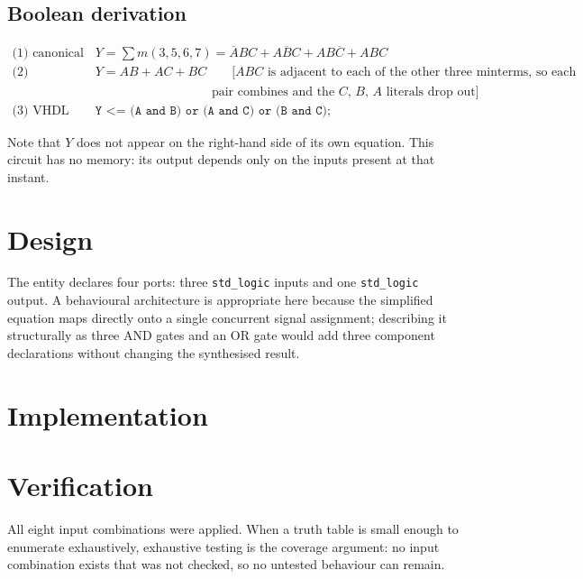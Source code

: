 \subsection*{Boolean derivation}

\begin{align*}
\text{(1) canonical} \quad & Y = \textstyle\sum m(3,5,6,7)
   = \overline{A}BC + A\overline{B}C + AB\overline{C} + ABC \\
\text{(2) simplified} \quad & Y = AB + AC + BC
   \qquad \text{[$ABC$ is adjacent to each of the other three minterms, so each}\\
   & \qquad\qquad\qquad\qquad\quad\ \text{pair combines and the $C$, $B$, $A$ literals drop out]}\\
\text{(3) VHDL} \quad & \texttt{Y <= (A and B) or (A and C) or (B and C);}
\end{align*}

Note that $Y$ does not appear on the right-hand side of its own equation. This
circuit has no memory: its output depends only on the inputs present at that
instant.

\section{Design}

The entity declares four ports: three \texttt{std\_logic} inputs and one
\texttt{std\_logic} output. A behavioural architecture is appropriate here
because the simplified equation maps directly onto a single concurrent signal
assignment; describing it structurally as three AND gates and an OR gate would
add three component declarations without changing the synthesised result.

\section{Implementation}


\section{Verification}

All eight input combinations were applied. When a truth table is small enough to
enumerate exhaustively, exhaustive testing is the coverage argument: no input
combination exists that was not checked, so no untested behaviour can remain.


